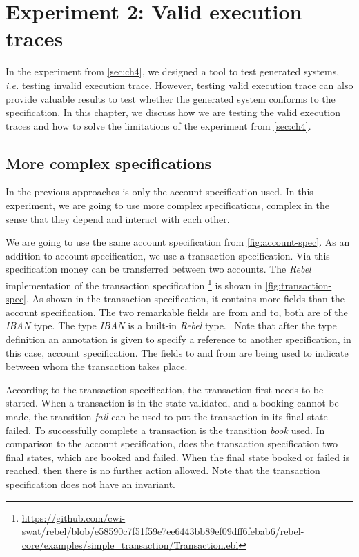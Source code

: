 \chapter{Experiment 2: Valid execution traces}\label{sec:ch5}

In the experiment from \autoref{sec:ch4}, we designed a tool to test generated
systems, \textit{i.e.} testing invalid execution trace. However, testing valid
execution trace can also provide valuable results to test whether the generated
system conforms to the specification. In this chapter, we discuss how we are
testing the valid execution traces and how to solve the limitations of the
experiment from \autoref{sec:ch4}.

\section{More complex specifications}\label{sec:ch5-complex-spec}
In the previous approaches is only the account specification used. In this
experiment, we are going to use more complex specifications, complex in the
sense that they depend and interact with each other.

We are going to use the
same account specification from \autoref{fig:account-spec}. As an addition to
account specification, we use a transaction specification. Via this
specification money can be transferred between two accounts.
The \textit{Rebel} implementation of the transaction specification \footnote{\url{https://github.com/cwi-swat/rebel/blob/e58590c7f51f59e7ee6443bb89ef09dff6febab6/rebel-core/examples/simple_transaction/Transaction.ebl}} is shown in \autoref{fig:transaction-spec}.
As shown in the transaction specification, it contains more fields than the
account specification. The two remarkable fields are from and to, both are of
the \textit{IBAN} type. The type \textit{IBAN} is a built-in \textit{Rebel}
type.~\cite[p.~3]{stoel_storm_vinju_bosman_2016} Note that after the type
definition an annotation is given to specify a reference to another
specification, in this case, account specification. The fields to and from are
being used to indicate between whom the transaction takes place.

According to the transaction specification, the transaction first
needs to be started. When a transaction is in the state validated, and a booking
cannot be made, the transition \textit{fail} can be used to put the transaction in its
final state failed. To successfully complete a transaction is the transition
\textit{book} used. In comparison to the account specification, does the transaction
specification two final states, which are booked and failed. When the final
state booked or failed is reached, then there is no further action allowed.
Note that the transaction specification does not have an invariant.

